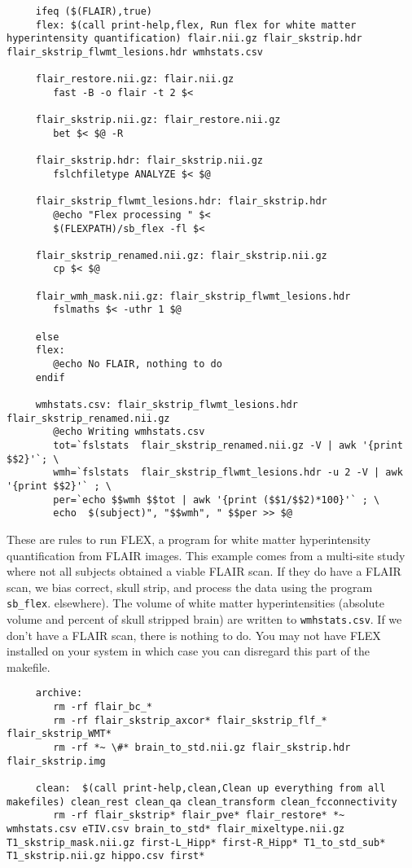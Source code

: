 \begin{lstlisting}
	 ifeq ($(FLAIR),true)
	 flex: $(call print-help,flex, Run flex for white matter hyperintensity quantification) flair.nii.gz flair_skstrip.hdr flair_skstrip_flwmt_lesions.hdr wmhstats.csv

	 flair_restore.nii.gz: flair.nii.gz
		fast -B -o flair -t 2 $<

	 flair_skstrip.nii.gz: flair_restore.nii.gz
		bet $< $@ -R

	 flair_skstrip.hdr: flair_skstrip.nii.gz 
		fslchfiletype ANALYZE $< $@

	 flair_skstrip_flwmt_lesions.hdr: flair_skstrip.hdr
		@echo "Flex processing " $< 
		$(FLEXPATH)/sb_flex -fl $< 

	 flair_skstrip_renamed.nii.gz: flair_skstrip.nii.gz
		cp $< $@

	 flair_wmh_mask.nii.gz: flair_skstrip_flwmt_lesions.hdr
		fslmaths $< -uthr 1 $@

	 else
	 flex:
		@echo No FLAIR, nothing to do
	 endif

	 wmhstats.csv: flair_skstrip_flwmt_lesions.hdr flair_skstrip_renamed.nii.gz
		@echo Writing wmhstats.csv 
		tot=`fslstats  flair_skstrip_renamed.nii.gz -V | awk '{print $$2}'`; \
		wmh=`fslstats  flair_skstrip_flwmt_lesions.hdr -u 2 -V | awk '{print $$2}'` ; \
		per=`echo $$wmh $$tot | awk '{print ($$1/$$2)*100}'` ; \
		echo  $(subject)", "$$wmh", " $$per >> $@ 
\end{lstlisting}

These are rules to run FLEX, a program for white matter hyperintensity
quantification from FLAIR images. This example comes from a multi-site
study where not all subjects obtained a viable FLAIR scan. If they do
have a FLAIR scan, we bias correct, skull strip, and process the data
using the program \texttt{sb_flex}.  elsewhere). The volume of white
matter hyperintensities (absolute volume and percent of skull stripped
brain) are written to \texttt{wmhstats.csv}. If we don't have a FLAIR
scan, there is nothing to do. You may not have FLEX installed on your
system in which case you can disregard this part of the makefile.


\begin{lstlisting}
	 archive:
		rm -rf flair_bc_*
		rm -rf flair_skstrip_axcor* flair_skstrip_flf_* flair_skstrip_WMT*
		rm -rf *~ \#* brain_to_std.nii.gz flair_skstrip.hdr flair_skstrip.img

	 clean:  $(call print-help,clean,Clean up everything from all makefiles) clean_rest clean_qa clean_transform clean_fcconnectivity
		rm -rf flair_skstrip* flair_pve* flair_restore* *~ wmhstats.csv eTIV.csv brain_to_std* flair_mixeltype.nii.gz T1_skstrip_mask.nii.gz first-L_Hipp* first-R_Hipp* T1_to_std_sub* T1_skstrip.nii.gz hippo.csv first*
\end{lstlisting}


